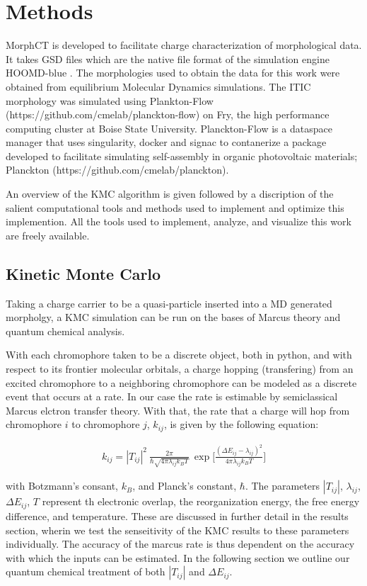 \chapter{Methods}
\label{chap:methods}

MorphCT is developed to facilitate charge characterization of morphological data. It takes GSD files which are
the native file format of the simulation engine HOOMD-blue \cite{Anderson2020a}. The morphologies used to
obtain the data for this work were obtained from equilibrium Molecular Dynamics simulations. The ITIC
morphology was simulated using Plankton-Flow (https://github.com/cmelab/planckton-flow) on Fry, the high
performance computing cluster at Boise State University. Planckton-Flow is a dataspace manager that uses
singularity, docker and signac to contanerize a package developed to facilitate simulating self-assembly in
organic photovoltaic materials; Planckton (https://github.com/cmelab/planckton).

An overview of the KMC algorithm is given followed by a discription of the salient computational tools and
methods used to implement and optimize this implemention. All the tools used to implement, analyze, and
visualize this work are freely available. 


\section{Kinetic Monte Carlo}

Taking a charge carrier to be a quasi-particle inserted into a MD generated morpholgy, a KMC
simulation can be run on the bases of Marcus theory and quantum chemical analysis.

With each chromophore taken to be a discrete object, both in python, and with respect to its frontier
molecular orbitals, a charge hopping (transfering) from an excited chromophore to a neighboring chromophore can be modeled
as a discrete event that occurs at a rate. In our case the rate is estimable by semiclassical Marcus elctron transfer theory. With that,
the rate that a charge
will hop from chromophore $i$ to chromophore $j$, $k_{ij}$, is given by the
following equation:

\begin{align}
    k_{ij}  =  |T_{ij}|^2\ \frac{2\pi}{\hbar \sqrt{4 \pi \lambda_{ij} k_{B} T}}\ \exp{\Bigg[ \frac{(\Delta
    E_{ij} - \lambda_{ij})^2}{ 4 \pi \lambda_{ij} k_{B} T} \Bigg] }
\end{align}

with Botzmann's consant, $k_{B}$, and Planck's constant, $\hbar$. The parameters $|T_{ij}|$, $\lambda_{ij}$,
$\Delta E_{ij}$, $T$ represent th electronic overlap, the reorganization energy, the free energy difference, and
temperature. These are discussed in further detail in the results section, wherin we test the senseitivity of
the KMC results to these parameters individually. 
The accuracy of the marcus rate is thus dependent on the accuracy with which the inputs can be estimated. In
the following section we outline our quantum chemical treatment of both $|T_{ij}|$ and $\Delta E_{ij}$.


